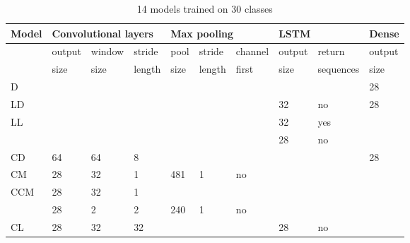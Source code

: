 \newcommand{\paint}{\cellcolor{gray!25}}
\begin{table}[!ht]
    \centering
    \footnotesize
    \caption{14 models trained on 30 classes}
    \label{tab:models}
\begin{tabular}{l||l|l|l||l|l|l||l|l||l}
\hline
Model  & \multicolumn{3}{l||}{Convolutional layers} & \multicolumn{3}{l||}{Max pooling} & \multicolumn{2}{l||}{LSTM} & Dense  \\ \hline
       & output       & window       & stride      & pool    & stride    & channel    & output     & return       & output \\ 
       & size         & size         & length      & size    & length    & first      & size       & sequences    & size   \\ \hline
                                                                                                                              \hline
D      & \paint       & \paint       &     \paint  & \paint  &  \paint   & \paint     & \paint     & \paint       & 28     \\ \hline

LD     & \paint       & \paint       &     \paint  & \paint  &  \paint   & \paint     & 32         & no           & 28     \\ \hline

LL     & \paint       & \paint       &     \paint  & \paint  &  \paint   & \paint     & 32         & yes          & \paint \\ 
       & \paint       & \paint       &     \paint  & \paint  &  \paint   & \paint     & 28         & no           & \paint \\ \hline

CD     & 64           & 64           & 8           & \paint  &  \paint   & \paint     & \paint     & \paint       & 28     \\ \hline

CM     & 28           & 32           & 1           & 481     & 1         & no         &  \paint    & \paint       & \paint \\ \hline

CCM    & 28           & 32           & 1           &         &           &            & \paint     & \paint       & \paint \\ 
       & 28           & 2            & 2           & 240     & 1         & no         & \paint     & \paint       & \paint \\ \hline

CL     & 28           & 32           & 32          & \paint  &  \paint   & \paint     & 28         & no           & \paint \\ \hline


\end{tabular}
\end{table}
